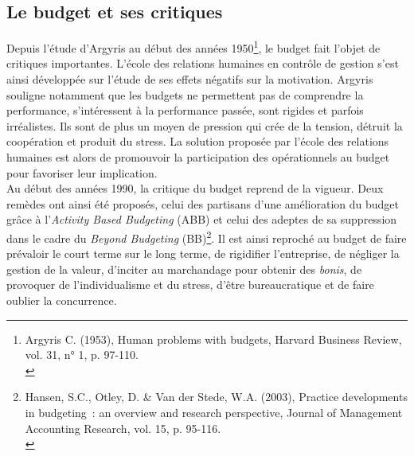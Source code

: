 \documentclass{tufte-handout}
\begin{document}
\subsection{Le budget et ses critiques}
\label{sec:orgf1d54f9}
Depuis l'étude d'Argyris au début des années 1950\footnote{Argyris C. (1953), Human problems with budgets, Harvard Business Review, vol. 31, n° 1, p. 97-110.\\}, le budget fait l'objet de critiques importantes. L'école des relations humaines en contrôle de gestion s'est ainsi développée sur l'étude de ses effets négatifs sur la motivation. Argyris souligne notamment que les budgets ne permettent pas de comprendre la performance, s'intéressent à la performance passée, sont rigides et parfois irréalistes. Ils sont de plus un moyen de pression qui crée de la tension, détruit la coopération et produit du stress. La solution proposée par l'école des relations humaines est alors de promouvoir la participation des opérationnels au budget pour favoriser leur implication.\\

Au début des années 1990, la critique du budget reprend de la vigueur. Deux remèdes ont ainsi été proposés, celui des partisans d'une amélioration du budget grâce à l'\emph{Activity Based Budgeting} (ABB) et celui des adeptes de sa suppression dans le cadre du \emph{Beyond Budgeting} (BB)\footnote{Hansen, S.C., Otley, D. \& Van der Stede, W.A. (2003), Practice developments in budgeting : an overview and research perspective, Journal of Management Accounting Research, vol. 15, p. 95-116.\\}. Il est ainsi reproché au budget de faire prévaloir le court terme sur le long terme, de rigidifier l'entreprise, de négliger la gestion de la valeur, d'inciter au marchandage pour obtenir des \emph{bonis}, de provoquer de l'individualisme et du stress, d'être bureaucratique et de faire oublier la concurrence.\\
\end{document}
